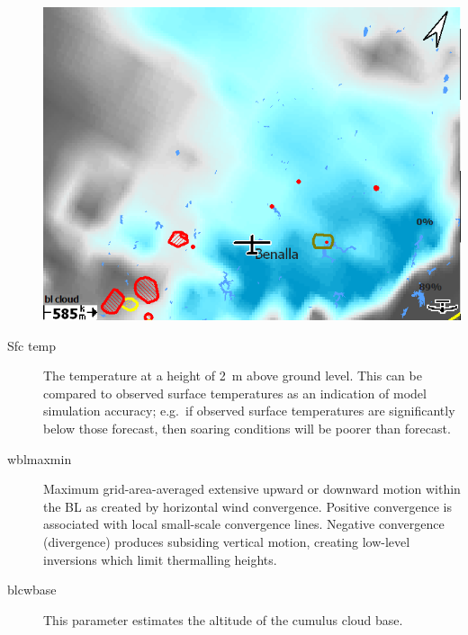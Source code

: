\begin{description}
\begin{center}
\includegraphics[angle=0,width=0.8\linewidth,keepaspectratio='true']{figures/rasp-blcloudpct.png}
\end{center}

\item[Sfc temp] 
The temperature at a height of 2~m above ground level.  This can be
compared to observed surface temperatures as an indication of model
simulation accuracy; e.g.\ if observed surface temperatures are
significantly below those forecast, then soaring conditions will be
poorer than forecast.
\item[wblmaxmin]  
Maximum grid-area-averaged extensive upward or downward motion within
the BL as created by horizontal wind convergence. Positive convergence
is associated with local small-scale convergence lines.  Negative
convergence (divergence) produces subsiding vertical motion, creating
low-level inversions which limit thermalling heights.
\item[blcwbase] This parameter estimates the altitude of the cumulus cloud
base.
\end{description}

